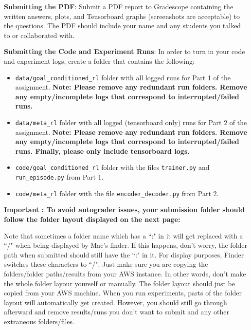 \documentclass[12pt]{article}
\begin{document}
\vspace{0.2cm}
\noindent\textbf{Submitting the PDF}: Submit a PDF report to Gradescope containing the written answers, plots, and Tensorboard graphs (screenshots are acceptable) to the questions. The PDF should include your name and any students you talked to or collaborated with.

\vspace{0.2cm}

\noindent\textbf{Submitting the Code and Experiment Runs}: In order to turn in your code and experiment logs, create a folder that contains the following:
\begin{itemize}
\item \texttt{data/goal\_conditioned\_rl} folder with all logged runs for Part 1 of the assignment. \textbf{Note: Please remove any redundant run folders. Remove any empty/incomplete logs that correspond to interrupted/failed runs.}

\item \texttt{data/meta\_rl} folder with all logged (tensorboard only) runs for Part 2 of the assignment. \textbf{Note: Please remove any redundant run folders. Remove any empty/incomplete logs that correspond to interrupted/failed runs. Finally, please only include tensorboard logs.}

\item \texttt{code/goal\_conditioned\_rl} folder with the files \texttt{trainer.py} and \texttt{run\_episode.py} from Part 1.

\item \texttt{code/meta\_rl} folder with the file \texttt{encoder\_decoder.py} from Part 2.
\end{itemize} 

\textbf{Important : To avoid autograder issues, your submission folder should follow the folder layout displayed on the next page:} 

Note that sometimes a folder name which has a ``:" in it will get replaced with a ``/" when being displayed by Mac's finder. If this happens, don't worry, the folder path when submitted should still have the ``:" in it. For display purposes, Finder switches these characters to ``/". Just make sure you are copying the folders/folder paths/results from your AWS instance. In other words, don't make the whole folder layour yourself or manually. The folder layout should just be copied from your AWS machine. When you run experiments, parts of the folder layout will automatically get created. However, you should still go through afterward and remove results/runs you don't want to submit and any other extraneous folders/files.
\end{document}
